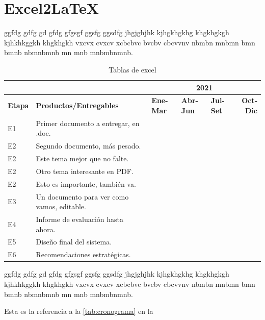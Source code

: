 \documentclass[a4paper,11pt]{article}
\begin{document}
	\section{Excel2LaTeX}
	
	ggfdg gdfg gd gfdg gfgsgf ggsfg ggsdfg jhgjghjhk kjhgkhgkhg khgkhgkgh kjhkhkggkh khgkhgkh vxcvx cvxcv xcbcbvc bvcbv cbcvvnv nbmbn mnbmn bmn bmnb nbmnbmnb mn mnb mnbmbnmnb.
	
	\begin{table}[htbp]
		\centering
		\caption{Tablas de excel}
		\begin{tabular}{p{2.39em}p{15.28em}lllr}
			\multicolumn{1}{l}{} & \multicolumn{1}{r}{} & \multicolumn{4}{c}{\textbf{2021}} \\
			\midrule
			\textbf{Etapa} & \textbf{Productos/Entregables} & \multicolumn{1}{p{4.055em}}{\textbf{Ene-Mar}} & \multicolumn{1}{p{4.055em}}{\textbf{Abr-Jun}} & \multicolumn{1}{p{4.055em}}{\textbf{Jul-Set}} & \multicolumn{1}{p{4.055em}}{\textbf{Oct-Dic}} \\
			\midrule
			E1    & Primer documento a entregar, en .doc. &       & \cellcolor[rgb]{ .718,  .871,  .91} &       &  \\
			E2    & Segundo documento, más pesado. & \cellcolor[rgb]{ .776,  .89,  .859} &       &       &  \\
			E2    & Este tema mejor que no falte. &       & \cellcolor[rgb]{ .776,  .89,  .859} &       &  \\
			E2    & Otro tema interesante en PDF. &       &       & \cellcolor[rgb]{ .776,  .89,  .859} &  \\
			E2    & Esto es importante, también va. &       &       & \cellcolor[rgb]{ .776,  .89,  .859} &  \\
			E3    & Un documento para ver como vamos, editable. &       & \cellcolor[rgb]{ .722,  .804,  .894} &       &  \\
			E4    & Informe de evaluación hasta ahora. &       & \cellcolor[rgb]{ .722,  .804,  .894} &       &  \\
			E5    & Diseño final del sistema. &       &       &       & \cellcolor[rgb]{ .722,  .804,  .894} \\
			E6    & Recomendaciones estratégicas. &       &       &       & \cellcolor[rgb]{ .722,  .804,  .894} \\
			\bottomrule
		\end{tabular}%
		\label{tab:cronograma}%
	\end{table}%
		ggfdg gdfg gd gfdg gfgsgf ggsfg ggsdfg jhgjghjhk kjhgkhgkhg khgkhgkgh kjhkhkggkh khgkhgkh vxcvx cvxcv xcbcbvc bvcbv cbcvvnv nbmbn mnbmn bmn bmnb nbmnbmnb mn mnb mnbmbnmnb.
		
	Esta es la referencia a la \autoref{tab:cronograma} en la 
	
\end{document}
